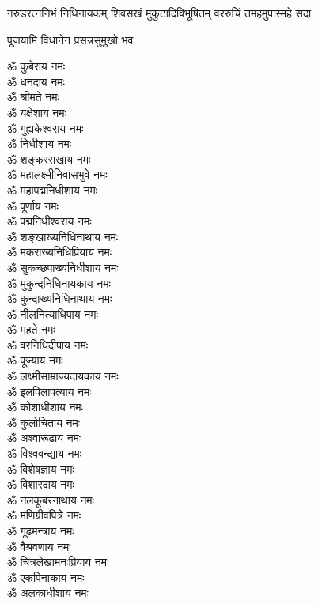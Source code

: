 
{गरुडरत्ननिभं निधिनायकम्}
{शिवसखं मुकुटादिविभूषितम्}
{वररुचिं तमहमुपास्महे सदा}

{पूजयामि विधानेन प्रसन्नसुमुखो भव}
\begin{multicols}{2}
\begin{flushleft}
ॐ कुबेराय नमः\\
ॐ धनदाय नमः\\
ॐ श्रीमते नमः\\
ॐ यक्षेशाय नमः\\
ॐ गुह्यकेश्वराय नमः\\
ॐ निधीशाय नमः\\
ॐ शङ्करसखाय नमः\\
ॐ महालक्ष्मीनिवासभुवे नमः\\
ॐ महापद्मनिधीशाय नमः\\
ॐ पूर्णाय नमः\hfill{}\\ %
ॐ पद्मनिधीश्वराय नमः\\
ॐ शङ्खाख्यनिधिनाथाय नमः\\
ॐ मकराख्यनिधिप्रियाय नमः\\
ॐ सुकच्छपाख्यनिधीशाय नमः\\
ॐ मुकुन्दनिधिनायकाय नमः\\
ॐ कुन्दाख्यनिधिनाथाय नमः\\
ॐ नीलनित्याधिपाय नमः\\
ॐ महते नमः\\
ॐ वरनिधिदीपाय नमः\\
ॐ पूज्याय नमः\hfill{}\\ %
ॐ लक्ष्मीसाम्राज्यदायकाय नमः\\
ॐ इलपिलापत्याय नमः\\
ॐ कोशाधीशाय नमः\\
ॐ कुलोचिताय नमः\\
ॐ अश्वारूढाय नमः\\
ॐ विश्ववन्द्याय नमः\\
ॐ विशेषज्ञाय नमः\\
ॐ विशारदाय नमः\\
ॐ नलकूबरनाथाय नमः\\
ॐ मणिग्रीवपित्रे नमः\hfill{}\\ %
ॐ गूढमन्त्राय नमः\\
ॐ वैश्रवणाय नमः\\
ॐ चित्रलेखामनःप्रियाय नमः\\
ॐ एकपिनाकाय नमः\\
ॐ अलकाधीशाय नमः\\

\end{flushleft}
\end{multicols}
